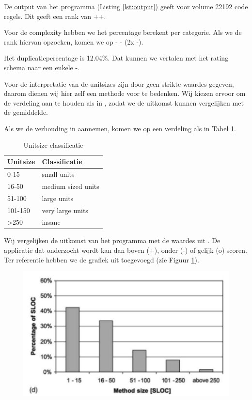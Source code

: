 \documentclass[a4paper]{article}
\begin{document}
De output van het programma (Listing \ref{lst:output}) geeft voor volume 22192 code regels. Dit geeft een rank van ++.

Voor de complexity hebben we het percentage berekent per categorie. Als we de rank hiervan opzoeken, komen we op - - (2x -).

Het duplicatiepercentage is 12.04\%. Dat kunnen we vertalen met het rating schema naar een enkele -.


Voor de interpretatie van de unitsizes zijn door \cite{A} geen strikte waardes gegeven, daarom dienen wij hier zelf een methode voor te bedenken.
Wij kiezen ervoor om de verdeling aan te houden als in \cite{B}, zodat we de uitkomst kunnen vergelijken met de gemiddelde.

Als we de verhouding in \cite{B} aannemen, komen we op een verdeling als in Tabel \ref{tbl:UnitSizeClassificatie}.

\begin{table}[h]
\caption{Unitsize classificatie}
\label{tbl:UnitSizeClassificatie}
\begin{tabular}{|l|l|}
\hline
Unitsize         & Classificatie      \\ \hline
0-15             & small units        \\
16-50            & medium sized units \\
51-100           & large units        \\
101-150          & very large units   \\
\textgreater{}250& insane             \\ \hline
\end{tabular}
\end{table}

Wij vergelijken de uitkomst van het programma met de waardes uit \cite{B}. De applicatie dat onderzocht wordt kan dan boven (+), onder (-) of gelijk (o) scoren. Ter referentie hebben we de grafiek uit \cite{B} toegevoegd (zie Figuur \ref{fig:RefVerdeling}).
\begin{figure}[htbp]
\centering
\includegraphics[width=0.8 \textwidth]{Capture.png}
\label{fig:RefVerdeling}
\end{figure}
\end{document}
